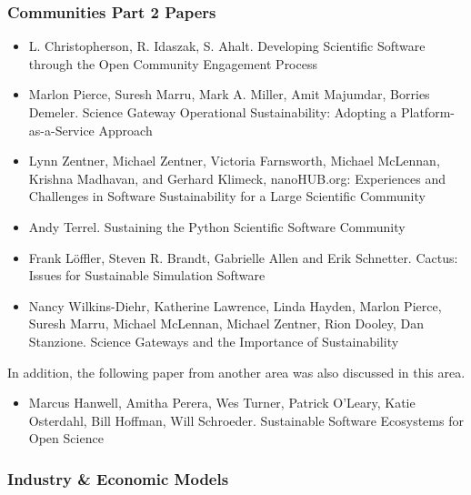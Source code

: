 \documentclass[11pt, oneside]{amsart}
\begin{document}
\subsubsection*{Communities Part 2 Papers}

\begin{itemize}

\item L. Christopherson, R. Idaszak, S. Ahalt. Developing Scientific Software through the Open Community Engagement Process \cite{Christopherson_WSSSPE}

\item Marlon Pierce, Suresh Marru, Mark A. Miller, Amit Majumdar, Borries Demeler. Science Gateway Operational Sustainability: Adopting a Platform-as-a-Service Approach \cite{Pierce2_WSSSPE}

\item Lynn Zentner, Michael Zentner, Victoria Farnsworth, Michael McLennan, Krishna Madhavan, and Gerhard Klimeck, nanoHUB.org: Experiences and Challenges in Software Sustainability for a Large Scientific Community \cite{Zentner_WSSSPE}

\item Andy Terrel. Sustaining the Python Scientific Software Community \cite{Terrel_WSSSPE}

\item Frank Löffler, Steven R. Brandt, Gabrielle Allen and Erik Schnetter. Cactus: Issues for Sustainable Simulation Software \cite{Loffler_WSSSPE}

\item Nancy Wilkins-Diehr, Katherine Lawrence, Linda Hayden, Marlon Pierce, Suresh Marru, Michael McLennan, Michael Zentner, Rion Dooley, Dan Stanzione. Science Gateways and the Importance of Sustainability \cite{Wilkins-Diehr_WSSSPE}

\end{itemize}

In addition, the following paper from another area was also discussed in this area.

\begin{itemize}

\item Marcus Hanwell, Amitha Perera, Wes Turner, Patrick O'Leary, Katie Osterdahl, Bill Hoffman, Will Schroeder. Sustainable Software Ecosystems for Open Science \cite{Hanwell_WSSSPE}

\end{itemize}

\subsubsection*{Industry \& Economic Models}
\end{document}
